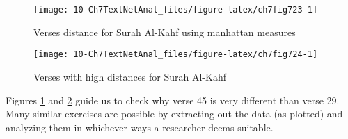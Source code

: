 \documentclass[
]{article}
\newenvironment{Shaded}{\begin{snugshade}}{\end{snugshade}}
\newcommand{\AttributeTok}[1]{\textcolor[rgb]{0.13,0.29,0.53}{#1}}
\newcommand{\ConstantTok}[1]{\textcolor[rgb]{0.56,0.35,0.01}{#1}}
\newcommand{\DecValTok}[1]{\textcolor[rgb]{0.00,0.00,0.81}{#1}}
\newcommand{\FunctionTok}[1]{\textcolor[rgb]{0.13,0.29,0.53}{\textbf{#1}}}
\newcommand{\NormalTok}[1]{#1}
\newcommand{\OtherTok}[1]{\textcolor[rgb]{0.56,0.35,0.01}{#1}}
\newcommand{\SpecialCharTok}[1]{\textcolor[rgb]{0.81,0.36,0.00}{\textbf{#1}}}
\newcommand{\StringTok}[1]{\textcolor[rgb]{0.31,0.60,0.02}{#1}}
\begin{document}
\begin{Shaded}
\end{Shaded}

\begin{figure}

{\centering \texttt{[image: 10-Ch7TextNetAnal\_files/figure-latex/ch7fig723-1]} 

}

\caption{Verses distance for Surah Al-Kahf using manhattan measures}\label{fig:ch7fig723}
\end{figure}

\begin{figure}

{\centering \texttt{[image: 10-Ch7TextNetAnal\_files/figure-latex/ch7fig724-1]} 

}

\caption{Verses with high distances for Surah Al-Kahf}\label{fig:ch7fig724}
\end{figure}

Figures \ref{fig:ch7fig723} and \ref{fig:ch7fig724} guide us to check why verse 45 is very different than verse 29. Many similar exercises are possible by extracting out the data (as plotted) and analyzing them in whichever ways a researcher deems suitable.
\end{document}
